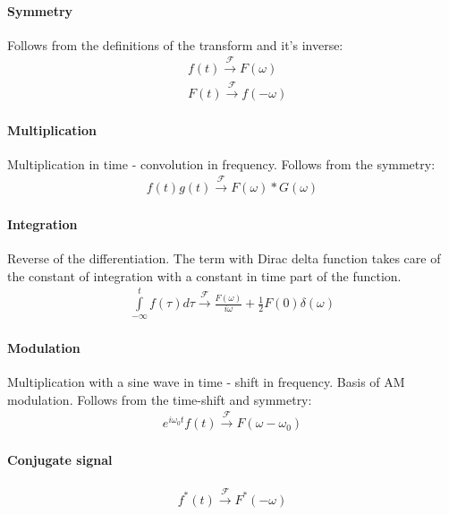 \documentclass{article}
\begin{document}
\paragraph{Symmetry} Follows from the definitions of the transform and it's inverse:
\begin{align*}
    &f(t) \xrightarrow{\mathcal{F}} F(\omega) \\
    &F(t) \xrightarrow{\mathcal{F}} f(-\omega)
\end{align*}

\paragraph{Multiplication} Multiplication in time - convolution in frequency. Follows from the symmetry:
\begin{align*}
    f(t)g(t) \xrightarrow{\mathcal{F}} F(\omega) * G(\omega)
\end{align*}

\paragraph{Integration} Reverse of the differentiation. 
The term with Dirac delta function takes care of the constant of integration with a constant in time part of the function.
\begin{align*}
    \int \limits^{t}_{-\infty}f(\tau)d \tau \xrightarrow{\mathcal{F}} \frac{F(\omega)}{i \omega} + \frac{1}{2}F(0)\delta(\omega)
\end{align*}

\paragraph{Modulation} Multiplication with a sine wave in time - shift in frequency. Basis of AM modulation.
Follows from the time-shift and symmetry:
\begin{align*}
    e^{i \omega_0 t}f(t) \xrightarrow{\mathcal{F}} F(\omega - \omega_0)
\end{align*}

\paragraph{Conjugate signal}
\begin{align*}
   f^*(t) \xrightarrow{\mathcal{F}} F^{*}(-\omega)
\end{align*}
\end{document}
